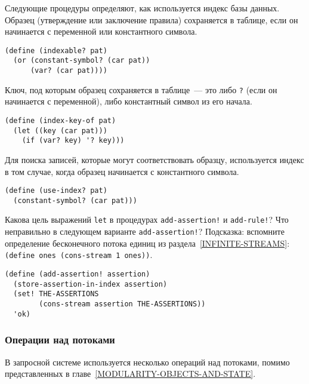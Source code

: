 Следующие процедуры определяют, как используется индекс
базы данных. Образец (утверждение или заключение правила) сохраняется
в таблице, если он начинается с переменной или константного символа.

\begin{Verbatim}[fontsize=\small]
(define (indexable? pat)
  (or (constant-symbol? (car pat))
      (var? (car pat))))
\end{Verbatim}
Ключ, под которым образец сохраняется в таблице~--- это либо
{\tt ?} (если он начинается с переменной), либо константный
символ из его начала.

\begin{Verbatim}[fontsize=\small]
(define (index-key-of pat)
  (let ((key (car pat)))
    (if (var? key) '? key)))
\end{Verbatim}
Для поиска записей, которые могут соответствовать
образцу, используется индекс в том случае, когда образец начинается с
константного символа.

\begin{Verbatim}[fontsize=\small]
(define (use-index? pat)
  (constant-symbol? (car pat)))
\end{Verbatim}

\begin{exercise}{4.70}%
\label{EX4.70}%
Какова цель выражений {\tt let} в процедурах
{\tt add-assertion!} и {\tt add-rule!}?  Что 
неправильно в следующем варианте {\tt add-assertion!}?
Подсказка: вспомните определение бесконечного потока единиц из 
раздела~\ref{INFINITE-STREAMS}: {\tt (define ones (cons-stream 1
ones))}.

\begin{Verbatim}[fontsize=\small]
(define (add-assertion! assertion)
  (store-assertion-in-index assertion)
  (set! THE-ASSERTIONS
        (cons-stream assertion THE-ASSERTIONS))
  'ok)
\end{Verbatim}
\end{exercise}

\subsubsection{Операции над потоками}
\label{STREAM-OPERATIONS}%

В 
запросной системе используется несколько операций над
потоками, помимо представленных в главе~\ref{MODULARITY-OBJECTS-AND-STATE}. 

